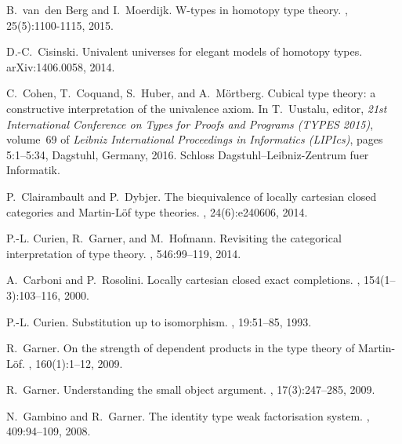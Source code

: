 \documentclass[reqno,10pt,a4paper,oneside]{amsart}
\numberwithin{equation}{section}
\theoremstyle{mythm}
\theoremstyle{mydef}
\theoremstyle{myrmk}
\begin{document}
\begin{thebibliography}{{}dBM15}
B.~{}van~den Berg and I.~Moerdijk.
\newblock W-types in homotopy type theory.
, 25(5):1100-1115,
  2015.
  
D.-C.~Cisinski.
\newblock Univalent universes for elegant models of homotopy types.
\newblock arXiv:1406.0058, 2014.


C.~Cohen, T.~Coquand, S.~Huber, and A.~M\"ortberg.
\newblock Cubical type theory: a constructive interpretation of the univalence
  axiom.
\newblock In T.~Uustalu, editor, {\em 21st International Conference on Types
  for Proofs and Programs (TYPES 2015)}, volume~69 of {\em Leibniz
  International Proceedings in Informatics (LIPIcs)}, pages 5:1--5:34,
  Dagstuhl, Germany, 2016. Schloss Dagstuhl--Leibniz-Zentrum fuer Informatik.

P.~Clairambault and P.~Dybjer.
\newblock The biequivalence of locally cartesian closed categories and
  {M}artin-{L}\"{o}f type theories.
, 24(6):e240606,
  2014.

P.-L. Curien, R.~Garner, and M.~Hofmann.
\newblock Revisiting the categorical interpretation of type theory.
, 546:99--119, 2014.

A.~Carboni and P.~Rosolini.
\newblock Locally cartesian closed exact completions.
, 154(1--3):103--116, 2000.

P.-L. Curien.
\newblock Substitution up to isomorphism.
, 19:51--85, 1993.

R.~Garner.
\newblock On the strength of dependent products in the type theory of
  {M}artin-{L}\"of.
, 160(1):1--12, 2009.

R.~Garner.
\newblock Understanding the small object argument.
, 17(3):247--285, 2009.

N.~Gambino and R.~Garner.
\newblock The identity type weak factorisation system.
, 409:94--109, 2008.


\end{thebibliography}
\end{document}
